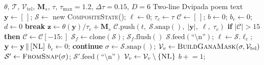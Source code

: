 \documentclass[11pt]{article}
\begin{document}
\begin{algorithm}[H]
\caption{Strategy~2: Logit Masking with Backtracking}
\label{alg:masking-backtrack}
\scriptsize
\begin{algorithmic}[1]
\Require $\theta$, $\mathcal{T}$, $\mathcal{V}_{\text{tel}}$,
         $\mathbf{M}_s$, $\tau$,
         $\tau_{\max}{=}1.2$,
         $\Delta\tau{=}0.15$, $D{=}6$
\Ensure Two-line Dvipada poem text
\State $\mathbf{y} \gets [\,]$;\;
       $\mathcal{S} \gets$ new \textsc{CompositeState}();\;
       $\ell \gets 0$;\; $\tau_c \gets \tau$
\State $\mathcal{C} \gets [\,]$;\;
       $b \gets 0$;\; $b_c \gets 0$;\; $d \gets 0$
     \textbf{break} \EndIf
    \State $\mathbf{z} \gets \theta(\mathbf{y})/\tau_c
           + \mathbf{M}_s$
    \State {}
        \State $\mathcal{C}.\text{push}(t,\;
               \mathcal{S}.\text{snap}(),\;
               |\mathbf{y}|,\; \ell,\; \tau_c)$
        \State \textbf{if} $|\mathcal{C}| > 15$
               \textbf{then}
               $\mathcal{C} \gets \mathcal{C}[-15:]$
    \EndIf
    \State {}
    \State $\mathcal{S}_f \gets \text{clone}(\mathcal{S})$;\;
           $\mathcal{S}_f.\text{flush}()$
        \State $\mathcal{S}.\text{feed}(
               \text{``\textbackslash n''})$;\;
               $\ell \gets \mathcal{S}.\ell_c$;\;
               $\mathbf{y} \gets \mathbf{y} \,\|\,
               [\textsc{NL}]$
        \State $b_c \gets 0$;\; \textbf{continue}
    \EndIf
    \State {}
    \State $\sigma \gets \mathcal{S}.\text{snap}()$;\;
           $\mathcal{V}_v \gets
           \textsc{BuildGanaMask}(\sigma,
           \mathcal{V}_{\text{tel}})$
    \State {}
        \State $\mathcal{S}' \gets
               \textsc{FromSnap}(\sigma)$;\;
               $\mathcal{S}'.\text{feed}(
               \text{``\textbackslash n''})$
            \State $\mathcal{V}_v \gets
                   \mathcal{V}_v \setminus
                   \{\textsc{NL}\}$
        \EndIf
    \EndIf
    \State {}
        \State $b \mathrel{+}= 1$;\;

\end{algorithmic}
\end{algorithm}
\end{document}
